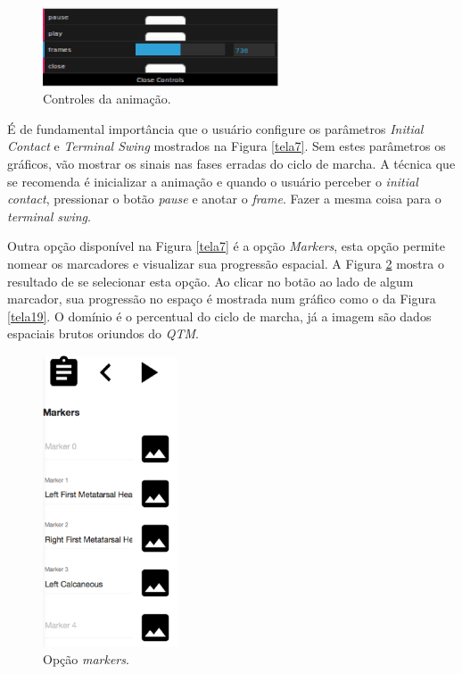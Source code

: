 \begin{figure}[ht]
	\centering
	\includegraphics[width=7cm]{figuras/tela17.eps}
	\caption{Controles da animação.}
	\label{animacao5}
\end{figure}






É de fundamental importância que o usuário configure os parâmetros \emph{Initial Contact} e \emph{Terminal Swing} mostrados na Figura \ref{tela7}. Sem estes parâmetros os gráficos, vão mostrar os sinais nas fases erradas do ciclo de marcha.
A técnica que se recomenda é inicializar a animação e quando o usuário perceber o \emph{initial contact}, pressionar o botão \emph{pause} e anotar o \emph{frame}. Fazer a mesma coisa para o \emph{terminal swing}.

Outra opção disponível na Figura \ref{tela7} é a opção \emph{Markers}, esta opção permite nomear os marcadores e visualizar sua progressão espacial. 
A Figura \ref{tela18} mostra o resultado de se selecionar esta opção.
Ao clicar no botão ao lado de algum marcador, sua progressão no espaço é mostrada num gráfico como o da Figura \ref{tela19}. O domínio é o percentual do ciclo de marcha, já a imagem são dados espaciais brutos oriundos do \emph{QTM}.

\begin{figure}[H]
	\centering
	\includegraphics[width=4cm]{figuras/tela18.eps}
	\caption{Opção \emph{markers}.}
	\label{tela18}
\end{figure}


